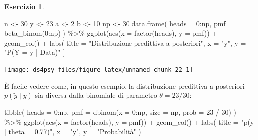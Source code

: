 \documentclass[
  11pt,
]{krantz}
\makeatletter
\newenvironment{Shaded}{\begin{snugshade}}{\end{snugshade}}
\newcommand{\AttributeTok}[1]{\textcolor[rgb]{0.61,0.61,0.61}{#1}}
\newcommand{\DecValTok}[1]{\textcolor[rgb]{0.06,0.06,0.06}{#1}}
\newcommand{\FunctionTok}[1]{\textcolor[rgb]{0,0,0}{#1}}
\newcommand{\NormalTok}[1]{#1}
\newcommand{\OtherTok}[1]{\textcolor[rgb]{0.37,0.37,0.37}{#1}}
\newcommand{\SpecialCharTok}[1]{\textcolor[rgb]{0,0,0}{#1}}
\newcommand{\StringTok}[1]{\textcolor[rgb]{0.5,0.5,0.5}{#1}}
\newenvironment{kframe}{%
\medskip{}
\setlength{\fboxsep}{.8em}
 \def\at@end@of@kframe{}%
 \ifinner\ifhmode%
  \def\at@end@of@kframe{\end{minipage}}%
  \begin{minipage}{\columnwidth}%
 \fi\fi%
 \def\FrameCommand##1{\hskip\@totalleftmargin \hskip-\fboxsep
 \colorbox{shadecolor}{##1}\hskip-\fboxsep
     \hskip-\linewidth \hskip-\@totalleftmargin \hskip\columnwidth}%
 \MakeFramed {\advance\hsize-\width
   \@totalleftmargin\z@ \linewidth\hsize
   \@setminipage}}%
 {\par\unskip\endMakeFramed%
 \at@end@of@kframe}
\renewenvironment{Shaded}{\begin{kframe}}{\end{kframe}}
\theoremstyle{definition}
\theoremstyle{definition}
\theoremstyle{definition}
\newtheorem{exercise}{Esercizio}[chapter]
\theoremstyle{definition}
\theoremstyle{remark}
\makeatother
\begin{document}
\begin{exercise}
\begin{Shaded}
\begin{Highlighting}[]
\NormalTok{n }\OtherTok{\textless{}{-}} \DecValTok{30}
\NormalTok{y }\OtherTok{\textless{}{-}} \DecValTok{23}
\NormalTok{a }\OtherTok{\textless{}{-}} \DecValTok{2}
\NormalTok{b }\OtherTok{\textless{}{-}} \DecValTok{10}
\NormalTok{np }\OtherTok{\textless{}{-}} \DecValTok{30}
\FunctionTok{data.frame}\NormalTok{(}
  \AttributeTok{heads =} \DecValTok{0}\SpecialCharTok{:}\NormalTok{np,}
  \AttributeTok{pmf =} \FunctionTok{beta\_binom}\NormalTok{(}\DecValTok{0}\SpecialCharTok{:}\NormalTok{np)}
\NormalTok{) }\SpecialCharTok{\%\textgreater{}\%}
  \FunctionTok{ggplot}\NormalTok{(}\FunctionTok{aes}\NormalTok{(}\AttributeTok{x =} \FunctionTok{factor}\NormalTok{(heads), }\AttributeTok{y =}\NormalTok{ pmf)) }\SpecialCharTok{+}
  \FunctionTok{geom\_col}\NormalTok{() }\SpecialCharTok{+}
  \FunctionTok{labs}\NormalTok{(}
    \AttributeTok{title =} \StringTok{"Distribuzione predittiva a posteriori"}\NormalTok{,}
    \AttributeTok{x =} \StringTok{"y\textquotesingle{}"}\NormalTok{,}
    \AttributeTok{y =} \StringTok{"P(Y = y\textquotesingle{} | Data)"}
\NormalTok{  )}
\end{Highlighting}
\end{Shaded}

\begin{center}\texttt{[image: ds4psy\_files/figure-latex/unnamed-chunk-22-1]} \end{center}

\noindent È facile vedere come, in questo esempio, la distribuzione predittiva a posteriori \(p(\tilde{y} \mid y)\) sia diversa dalla binomiale di parametro \(\theta = 23/30\):

\begin{Shaded}
\begin{Highlighting}[]
\FunctionTok{tibble}\NormalTok{(}
  \AttributeTok{heads =} \DecValTok{0}\SpecialCharTok{:}\NormalTok{np,}
  \AttributeTok{pmf =} \FunctionTok{dbinom}\NormalTok{(}\AttributeTok{x =} \DecValTok{0}\SpecialCharTok{:}\NormalTok{np, }\AttributeTok{size =}\NormalTok{ np, }\AttributeTok{prob =} \DecValTok{23} \SpecialCharTok{/} \DecValTok{30}\NormalTok{)}
\NormalTok{) }\SpecialCharTok{\%\textgreater{}\%}
  \FunctionTok{ggplot}\NormalTok{(}\FunctionTok{aes}\NormalTok{(}\AttributeTok{x =} \FunctionTok{factor}\NormalTok{(heads), }\AttributeTok{y =}\NormalTok{ pmf)) }\SpecialCharTok{+}
  \FunctionTok{geom\_col}\NormalTok{() }\SpecialCharTok{+}
  \FunctionTok{labs}\NormalTok{(}
    \AttributeTok{title =} \StringTok{"p(y | theta = 0.77)"}\NormalTok{,}
    \AttributeTok{x =} \StringTok{"y"}\NormalTok{,}
    \AttributeTok{y =} \StringTok{"Probabilità"}
\NormalTok{  )}
\end{Highlighting}
\end{Shaded}


\end{exercise}
\end{document}
